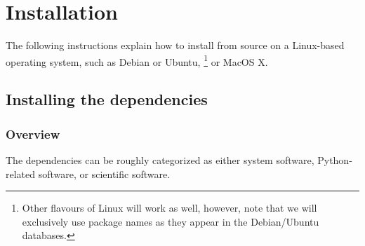 \chapter{Installation}

The following instructions explain how to install \EOS from source on a 
Linux-based operating system, such as Debian
or Ubuntu, \footnote{%
    Other flavours of Linux will work as well, however, note that
    we will exclusively use package names as they appear in the Debian/Ubuntu
     databases.
}
or MacOS X.

\section{Installing the dependencies}

\subsection{Overview}
\label{sec:inst:depend:overview}

The dependencies can be roughly categorized as either system software, Python-related
software, or scientific software.\\


